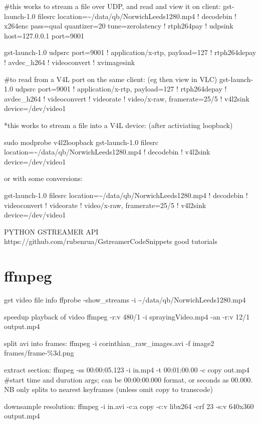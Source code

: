 \documentclass[oneside,english]{scrbook}
\begin{document}
\#this works to stream a file over UDP, and read and view it on client:
gst-launch-1.0 filesrc location=\textasciitilde{}/data/qb/NorwichLeeds1280.mp4
! decodebin ! x264enc pass=qual quantizer=20 tune=zerolatency ! rtph264pay
! udpsink host=127.0.0.1 port=9001

gst-launch-1.0 udpsrc port=9001 ! \textquotedbl{}application/x-rtp,
payload=127\textquotedbl{} ! rtph264depay ! avdec\_h264 ! videoconvert
! xvimagesink

\#to read from a V4L port on the same client: (eg then view in VLC)
gst-launch-1.0 udpsrc port=9001 ! \textquotedbl{}application/x-rtp,
payload=127\textquotedbl{} ! rtph264depay ! avdec\_h264 ! videoconvert
! videorate ! video/x-raw, framerate=25/5 ! v4l2sink device=/dev/video1

{*}this works to stream a file into a V4L device: (after activiating
loopback)

sudo modprobe v4l2loopback gst-launch-1.0 filesrc location=\textasciitilde{}/data/qb/NorwichLeeds1280.mp4
! decodebin ! v4l2sink device=/dev/video1

or with some conversions:

gst-launch-1.0 filesrc location=\textasciitilde{}/data/qb/NorwichLeeds1280.mp4
! decodebin ! videoconvert ! videorate ! video/x-raw, framerate=25/5
! v4l2sink device=/dev/video1

PYTHON GSTREAMER API https://github.com/rubenrua/GstreamerCodeSnippets
good tutorials


\chapter{ffmpeg}

get video file info ffprobe -show\_streams -i \textasciitilde{}/data/qb/NorwichLeeds1280.mp4

speedup playback of video ffmpeg -r:v \textquotedbl{}480/1\textquotedbl{}
-i sprayingVideo.mp4 -an -r:v \textquotedbl{}12/1\textquotedbl{} output.mp4

split avi into frames: ffmpeg -i corinthian\_raw\_images.avi -f image2
frames/frame-\%3d.png 

extract section: ffmpeg -ss 00:00:05.123 -i in.mp4 -t 00:01:00.00
-c copy out.mp4 \#start time and duration args; can be 00:00:00.000
format, or seconds as 00.000. NB only splits to nearest keyframes
(unless omit copy to transcode)

downsample resolution: ffmpeg -i in.avi -c:a copy -c:v libx264 -crf
23 -s:v 640x360 output.mp4
\end{document}
